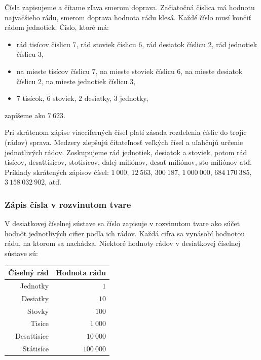 \documentclass{article}
\begin{document}
Čísla zapisujeme a čítame zľava smerom doprava. Začiatočná číslica má hodnotu najväčšieho rádu, smerom doprava hodnota rádu klesá. Každé číslo musí končiť rádom jednotiek. Číslo, ktoré má:
\begin{itemize}
  \item rád tisícov číslicu \(7\), rád stoviek číslicu \(6\), rád desiatok číslicu \(2\), rád jednotiek číslicu \(3\),
  \item na mieste tisícov číslicu \(7\), na mieste stoviek číslicu \(6\), na mieste desiatok číslicu \(2\), na mieste jednotiek číslicu \(3\),
  \item \(7\) tisícok, \(6\) stoviek, \(2\) desiatky, \(3\) jednotky,
\end{itemize}
zapíšeme ako \(7\ 623\).

Pri skrátenom zápise viacciferných čísel platí zásada rozdelenia číslic do trojíc (rádov) sprava. Medzery zlepšujú čitateľnosť veľkých čísel a uľahčujú určenie jednotlivých rádov. Zoskupujeme rád jednotiek, desiatok a stoviek, potom rád tisícov, desaťtisícov, stotisícov, ďalej miliónov, desať miliónov, sto miliónov atď. Príklady skrátených zápisov čísel: \(1\ 000\), \(12\ 563\), \(300\ 187\), \(1\ 000\ 000\), \(684\ 170\ 385\), \(3\ 158\ 032\ 902\), atď.

\subsubsection{Zápis čísla v rozvinutom tvare}

V desiatkovej číselnej sústave sa číslo zapisuje v rozvinutom tvare ako súčet hodnôt jednotlivých cifier podľa ich rádov. Každá cifra sa vynásobí hodnotou rádu, na ktorom sa nachádza. Niektoré hodnoty rádov v desiatkovej číselnej sústave sú:

\begin{table}[H]
  \centering
  \renewcommand{\arraystretch}{1.2}
  \begin{tabular}{|r|r|}
    \hline
    \textbf{Číselný rád} & \textbf{Hodnota rádu} \\
    \hline
    Jednotky & \(1\) \\
    \hline
    Desiatky & \(10\) \\
    \hline
    Stovky & \(100\) \\
    \hline
    Tisíce & \(1\ 000\) \\
    \hline
    Desaťtisíce & \(10\ 000\) \\
    \hline
    Státisíce & \(100\ 000\) \\
    \hline
  \end{tabular}
\end{table}
\end{document}

